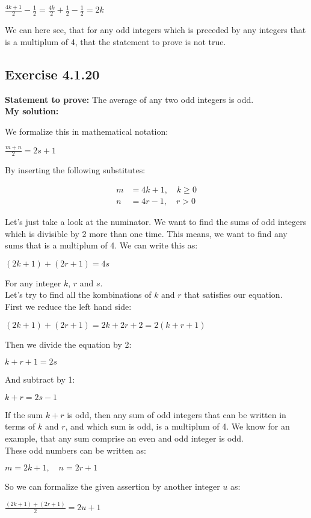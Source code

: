 \documentclass{article}
\newcommand{\cent}[1]{\begin{center}#1\end{center}}
\newcommand{\mAlign}[1]{\begin{align*}#1\end{align*}}
\newcommand{\Prove}{\textbf{Statement to prove: }}
\newcommand{\Solution}{\textbf{My solution: }}
\newcommand{\QED}{\boxed{}}
\newcommand{\Exercise}[1]{\subsection{Exercise #1}}
\begin{document}
	\cent{$\frac{4k +1}{2} - \frac{1}{2} = \frac{4k}{2} + \frac{1}{2} - \frac{1}{2} = 2k$}
	
	We can here see, that for any odd integers which is preceded by any integers that is a multiplum of 4, that the statement to prove is not true.\\
	\QED
	
	\Exercise{4.1.20}
	\Prove
	The average of any two odd integers is odd.\\
	
	\Solution
	
	We formalize this in mathematical notation:
	
	\cent{$\frac{m +n }{2} = 2s + 1$}
	
	By inserting the following substitutes:
	
	\mAlign{m &= 4k + 1, \quad  k \geq 0\\
				  n &= 4r -1, \quad r > 0}
	
	Let's just take a look at the numinator. We want to find the sums of odd integers which is divisible by 2 more than one time. This means, we want to find any sums that is a multiplum of 4. We can write this as:
	
	\cent{$(2k+1)+(2r+1)=4s$}
	
	For any integer $k$, $r$ and $s$.\\
	
	Let's try to find all the kombinations of $k$ and $r$ that satisfies our equation.\\
	
	First we reduce the left hand side:
	
	\cent{$(2k+1)+ (2r+1) = 2k + 2r + 2 = 2(k+r + 1 )$}
	
	Then we divide the equation by 2:
	
	\cent{$k+r+1=2s$}
	
	And subtract by 1:
	
	\cent{$k+r=2s-1$}
	
	If the sum $k+r$ is odd, then any sum of odd integers that can be written in terms of $k$ and $r$, and which sum is odd, is a multiplum of 4. We know for an example, that any sum comprise an even and odd integer is odd.\\
	
	These odd numbers can be written as:
		
	\cent{$m = 2k+1, \quad n = 2r+1 $}
	
	So we can formalize the given assertion by another integer $u$ as:
	
	\cent{$\frac{(2k+1) + (2r+1)}{2} = 2u +1$}
	
\end{document}
